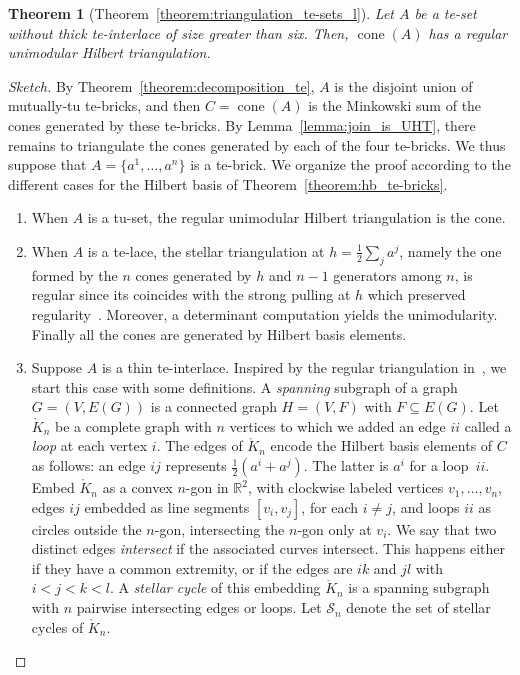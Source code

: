 \documentclass[11pt,a4paper]{amsart}
\theoremstyle{plain}
\newtheorem{theorem}{Theorem}[section]%
\theoremstyle{definition}
\newcommand{\cal}[1]{\mathcal{#1}}
\newcommand{\R}{\mathbb{R}}
\DeclareMathOperator{\cone}{cone}
\renewcommand{\cal}[1]{\mathcal{#1}}
\begin{document}
\begin{theorem}[Theorem~\ref{theorem:triangulation_te-sets_l}]\label{theorem:triangulation_te-sets}
	Let $A$ be a te-set without thick te-interlace of size greater than six.
	Then, $\cone (A)$ has a regular unimodular Hilbert triangulation.
\end{theorem}
\begin{proof}[Sketch]
	By Theorem~\ref{theorem:decomposition_te}, $A$ is the disjoint union of mutually-tu te-bricks, and then $C = \cone(A)$ is the Minkowski sum of the cones generated by these te-bricks.
	By Lemma~\ref{lemma:join_is_UHT}, there remains to triangulate the cones generated by each of the four te-bricks.
	We thus suppose that $A=\{a^1,\ldots,a^n\}$ is a te-brick.
	We organize the proof according to the different cases for the Hilbert basis of Theorem~\ref{theorem:hb_te-bricks}.
	\begin{enumerate}[label=\em\arabic*., ref=\arabic*.]
		\item When $A$ is a tu-set, the regular unimodular Hilbert triangulation is the cone.
		\item When $A$ is a te-lace, the stellar triangulation at $h=\frac{1}{2}\sum_j a^j$, namely the one formed by the $n$ cones generated by $h$ and $n-1$ generators among $n$, is regular since its coincides with the strong pulling at $h$ which preserved regularity~\cite[Lemma~2.1]{Haase_Paffenholz_Piechnik_Santos_2021}.	Moreover, a determinant computation yields the unimodularity. Finally all the cones are generated by Hilbert basis elements.
		\item Suppose $A$ is a thin te-interlace.\label{caseproof:second_hypersimplex_triang}
		Inspired by the regular triangulation in~\cite{DeLoera_Sturmfels_Thomas_1995}, we start this case with some definitions.
		A \emph{spanning} subgraph of a graph $G=(V,E(G))$ is a connected graph $H=(V,F)$ with $F\subseteq E(G)$.
		Let $\mathring{K}_n$ be a complete graph with $n$ vertices to which we added an edge $ii$ called a \emph{loop} at each vertex $i$.
		The edges of $\mathring{K}_n$ encode the Hilbert basis elements of $C$ as follows: an edge $ij$ represents $\frac{1}{2}(a^i+a^j)$. The latter is $a^i$ for a loop~$ii$.
		Embed $\mathring{K}_n$ as a convex $n$-gon in $\R^2$, with clockwise labeled vertices $v_1,\dots,v_n$, edges $ij$ embedded as line segments $[v_i,v_j]$, for each  $i\neq j$, and loops $ii$ as circles outside the $n$-gon, intersecting the $n$-gon only at $v_i$.
		We say that two distinct edges \emph{intersect} if the associated curves intersect.		
		This happens either if they have a common extremity, or if the edges are $ik$ and $jl$ with $i<j<k<l$.
		A \emph{stellar cycle} of this embedding $\mathring{K}_n$ is a spanning subgraph with $n$ pairwise intersecting edges or loops.
		Let $\cal S_n$ denote the set of stellar cycles of $ \mathring{K}_n$.
		

\end{enumerate}
\end{proof}
\end{document}
